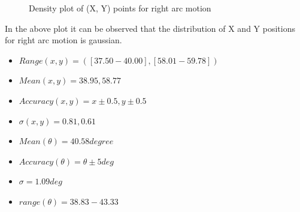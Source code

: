 \documentclass[11pt,a4paper,titlepage]{article}
\begin{document}
\begin{itemize}
\begin{figure}[H]
		\label{fig:sub1}
	\caption{\color{blue}Density plot of (X, Y) points for right arc motion}
  \end{figure}
  In the above plot it can be observed that the distribution of X and Y positions for right arc motion is gaussian.
\begin{itemize}
\item $ Range (x,y) =([37.50-40.00],[58.01-59.78])  $
\item $ Mean (x, y) = 38.95,58.77$
\item $ Accuracy (x,y) = x \pm0.5 , y \pm0.5  $ 
\item $ \sigma (x, y)= 0.81, 0.61 $
\item $ Mean(\theta) = 40.58 degree$
\item $ Accuracy (\theta)= \theta \pm5  deg $
\item $ \sigma = 1.09 deg$
\item $ range (\theta) = 38.83 - 43.33 $
\end{itemize}

\end{itemize}
\end{document}
